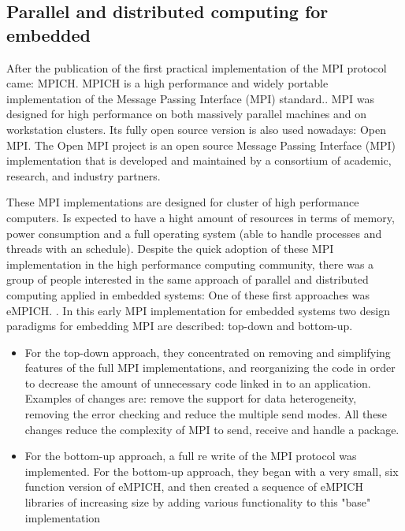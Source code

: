 \subsection{Parallel and distributed computing for embedded}

After the publication of \cite{Salim} the first practical implementation of the
MPI protocol came: MPICH. MPICH is a high performance and widely portable
implementation of the Message Passing Interface (MPI) standard.\cite{Gropp}.
MPI was designed for high performance on both massively parallel machines and
on workstation clusters. Its fully open source version is also used nowadays:
Open MPI. The Open MPI project is an open source Message Passing Interface
(MPI) implementation that is developed and maintained by a consortium of
academic, research, and industry partners.


These MPI implementations are designed for cluster of high performance
computers. Is expected to have a hight amount of resources in terms of memory,
power consumption and a full operating system (able to handle processes and
threads with an schedule). Despite the quick adoption of these MPI
implementation in the high performance computing community, there was a group
of people interested in the same approach of parallel and distributed computing
applied in embedded systems: One of these first approaches was eMPICH.
\cite{McMahon}. In this early MPI implementation for embedded systems  two
design paradigms for embedding MPI are described: top-down and bottom-up.

\begin{itemize}
\item For the top-down approach, they concentrated on removing and simplifying
features of the full MPI implementations, and reorganizing the code in order to
decrease the amount of unnecessary code linked in to an application. Examples
of changes are: remove the support for data heterogeneity, removing the error
checking and reduce the multiple send modes. All these changes reduce the
complexity of MPI to send, receive and handle a package.

\item For the bottom-up approach, a full re write of the MPI protocol was
implemented. For the bottom-up approach, they began with a very small, six
function version of eMPICH, and then created a sequence of eMPICH libraries
of increasing size by adding various functionality to this "base" implementation
\end{itemize}

